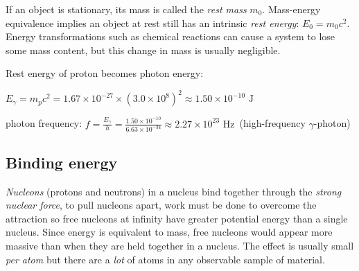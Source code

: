 If an object is stationary, its mass is called the \emph{rest mass} $m_0$. Mass-energy equivalence implies an object at rest still has an intrinsic \emph{rest energy}: $E_0 = m_0 c^2$. Energy transformations such as chemical reactions can cause a system to lose some mass content, but this change in mass is usually negligible.

\newpage


\begin{soln}Rest energy of proton becomes photon energy:

{

\centering

$E_\gamma=m_pc^2 = 1.67\times10^{-27} \times (3.0\times10^8)^2 \approx 1.50\times10^{-10} \text{ J}$

}

photon frequency: $f=\frac{E_\gamma}{h} = \frac{1.50\times10^{-10}}{6.63\times10^{-34}} \approx 2.27 \times10^{23} \text{ Hz}\,$ (high-frequency $\gamma$-photon) \end{soln}





\subsection{Binding energy}

\emph{Nucleons} (protons and neutrons) in a nucleus bind together through the \emph{strong nuclear force}, to pull nucleons apart, work must be done to overcome the attraction so free nucleons at infinity have greater potential energy than a single nucleus. Since energy is equivalent to mass, free nucleons would appear more massive than when they are held together in a nucleus. The effect is usually small \emph{per atom} but there are a \emph{lot} of atoms in any observable sample of material.


